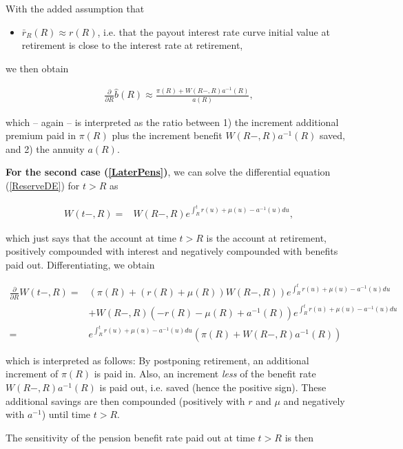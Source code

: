 \documentclass{article}
\newcommand{\1}[1]{\mathbbm{1}_{\left\lbrace #1 \right\rbrace}}
\theoremstyle{break}
\theoremstyle{remark}
\numberwithin{equation}{section}
\begin{document}
With the added assumption that

\begin{itemize}
	\item $\bar{r}_R (R) \approx r (R)$, i.e. that the payout interest rate curve initial value at retirement is close to the interest rate at retirement,
\end{itemize}

we then obtain

\begin{align} \label{ResultFirst}
	\frac{\partial}{\partial R} \hat{b}(R) \approx \frac{\pi(R) + W(R-,R) a^{-1}(R)}{a(R)},
\end{align}

which -- again -- is interpreted as the ratio between 1) the increment additional premium paid in $\pi(R)$ plus the increment benefit $W(R-,R) a^{-1}(R)$ saved, and 2) the annuity $a(R)$.

\textbf{For the second case (\ref{LaterPens})}, we can solve the differential equation (\ref{ReserveDE}) for $t>R$ as

\begin{align} \label{ReserveAfterRetirement}
	W(t-,R) =& W(R-,R) e^{\int_R^t r(u) + \mu(u) - a^{-1}(u) du},
\end{align}

which just says that the account at time $t>R$ is the account at retirement, positively compounded with interest and negatively compounded with benefits paid out. Differentiating, we obtain

\begin{align*}
	\frac{\partial}{\partial R} W(t-,R) =& \left( \pi(R) + \left(r(R) + \mu(R)\right) W(R-,R) \right) e^{\int_R^t r(u) + \mu(u) - a^{-1}(u) du} \\
	&+ W(R-,R) \left( - r(R) - \mu(R) + a^{-1}(R) \right) e^{\int_R^t r(u) + \mu(u) - a^{-1}(u) du} \\
	=& e^{\int_R^t r(u) + \mu(u) - a^{-1}(u) du} \left( \pi (R) + W(R-,R) a^{-1}(R) \right)
\end{align*}

which is interpreted as follows: By postponing retirement, an additional increment of $\pi(R)$ is paid in. Also, an increment \textit{less} of the benefit rate $W(R-,R) a^{-1}(R)$ is paid out, i.e. saved (hence the positive sign). These additional savings are then compounded (positively with $r$ and $\mu$ and negatively with $a^{-1}$) until time $t>R$.

The sensitivity of the pension benefit rate paid out at time $t>R$ is then
\end{document}
